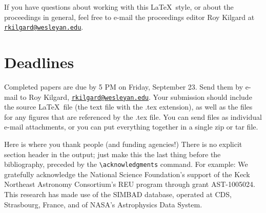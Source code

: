 \documentclass{knac}
\begin{document}
If you have questions about working with this \LaTeX\ style, or about
the proceedings in general, feel free to e-mail the proceedings editor
Roy Kilgard at \href{mailto:rkilgard@wesleyan.edu}{\nolinkurl{rkilgard@wesleyan.edu}}.


\section{Deadlines}

Completed papers are due by 5 PM on Friday, September 23.  Send them by
e-mail to Roy Kilgard,
\href{mailto:rkilgard@wesleyan.edu}{\nolinkurl{rkilgard@wesleyan.edu}}.
Your submission should include the source \LaTeX\ file (the text file
with the .tex extension), as well as the files for any figures that
are referenced by the .tex file.  You can send files as individual
e-mail attachments, or you can put everything together in a single zip
or tar file.



\acknowledgments

Here is where you thank people (and funding agencies!)  There is no
explicit section header in the output; just make this the last thing
before the bibliography, preceded by the \verb|\acknowledgments|
command. For example:  We gratefully acknowledge the National
Science Foundation's support of the Keck Northeast Astronomy
Consortium's REU program through grant AST-1005024. This research has
made use of the SIMBAD database, operated at CDS, Strasbourg, France,
and of NASA's Astrophysics Data System.



\end{document}

